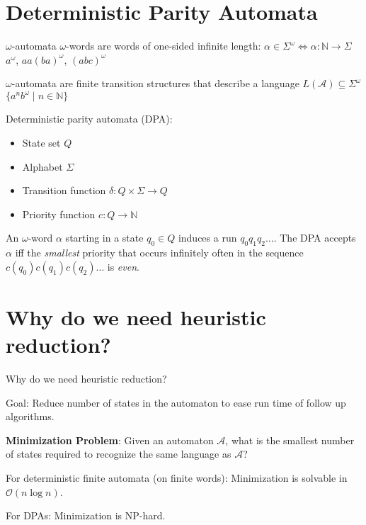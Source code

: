 
\section{Deterministic Parity Automata}
\begin{frame}{$\omega$-automata}
$\omega$-words are words of one-sided infinite length: $\alpha \in \Sigma^\omega \Leftrightarrow \alpha : \mathbb{N} \rightarrow \Sigma$ \\
$a^\omega$, $aa(ba)^\omega$, $(abc)^\omega$

\vspace{.5cm}

$\omega$-automata are finite transition structures that describe a language $L(\mathcal{A}) \subseteq \Sigma^\omega$ \\
$\{ a^n b^\omega \mid n \in \mathbb{N} \}$

\vspace{.5cm}

Deterministic parity automata (DPA):
\begin{itemize}
	\item State set $Q$
	\item Alphabet $\Sigma$
	\item Transition function $\delta : Q \times \Sigma \rightarrow Q$
	\item Priority function $c : Q \rightarrow \mathbb{N}$
\end{itemize}

An $\omega$-word $\alpha$ starting in a state $q_0 \in Q$ induces a run $q_0 q_1 q_2 \dots$. The DPA accepts $\alpha$ iff the \emph{smallest} priority that occurs infinitely often in the sequence $c(q_0) c(q_1) c(q_2) \dots$ is \emph{even}.

\end{frame}


\section{Why do we need heuristic reduction?}
\begin{frame}{Why do we need heuristic reduction?}

Goal: Reduce number of states in the automaton to ease run time of follow up algorithms.

\textbf{Minimization Problem}: Given an automaton $\mathcal{A}$, what is the smallest number of states required to recognize the same language as $\mathcal{A}$?

For deterministic finite automata (on finite words): Minimization is solvable in $\mathcal{O}(n \log n)$.

For DPAs: Minimization is NP-hard. \cite{}

\end{frame}


